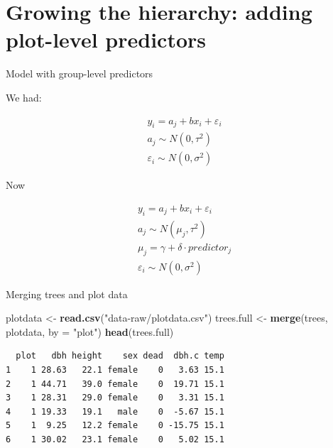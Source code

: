 \documentclass[10pt,ignorenonframetext,]{beamer}
\newenvironment{Shaded}{\begin{snugshade}}{\end{snugshade}}
\newcommand{\KeywordTok}[1]{\textcolor[rgb]{0.13,0.29,0.53}{\textbf{{#1}}}}
\newcommand{\DataTypeTok}[1]{\textcolor[rgb]{0.13,0.29,0.53}{{#1}}}
\newcommand{\StringTok}[1]{\textcolor[rgb]{0.31,0.60,0.02}{{#1}}}
\newcommand{\NormalTok}[1]{{#1}}
\begin{document}
\section{Growing the hierarchy: adding plot-level
predictors}\label{growing-the-hierarchy-adding-plot-level-predictors}

\begin{frame}{Model with group-level predictors}

We had:

\[
  \begin{aligned}
  y_{i} = a_{j} + bx_{i} + \varepsilon_{i}  \\
  a_{j} \sim N(0, \tau^2)  \\
  \varepsilon_{i} \sim N(0, \sigma^2) 
  \end{aligned}
\]

Now

\[
  \begin{aligned}
  y_{i} = a_{j} + bx_{i} + \varepsilon_{i}  \\
  a_{j} \sim N(\mu_{j}, \tau^2)  \\
  \mu_{j} = \gamma + \delta \cdot predictor_{j}  \\
  \varepsilon_{i} \sim N(0, \sigma^2)
  \end{aligned}
\]

\end{frame}

\begin{frame}[fragile]{Merging trees and plot data}

\begin{Shaded}
\begin{Highlighting}[]
\NormalTok{plotdata <-}\StringTok{ }\KeywordTok{read.csv}\NormalTok{(}\StringTok{"data-raw/plotdata.csv"}\NormalTok{)}
\NormalTok{trees.full <-}\StringTok{ }\KeywordTok{merge}\NormalTok{(trees, plotdata, }\DataTypeTok{by =} \StringTok{"plot"}\NormalTok{)}
\KeywordTok{head}\NormalTok{(trees.full)}
\end{Highlighting}
\end{Shaded}

\begin{verbatim}
  plot   dbh height    sex dead  dbh.c temp
1    1 28.63   22.1 female    0   3.63 15.1
2    1 44.71   39.0 female    0  19.71 15.1
3    1 28.31   29.0 female    0   3.31 15.1
4    1 19.33   19.1   male    0  -5.67 15.1
5    1  9.25   12.2 female    0 -15.75 15.1
6    1 30.02   23.1 female    0   5.02 15.1
\end{verbatim}

\end{frame}
\end{document}
